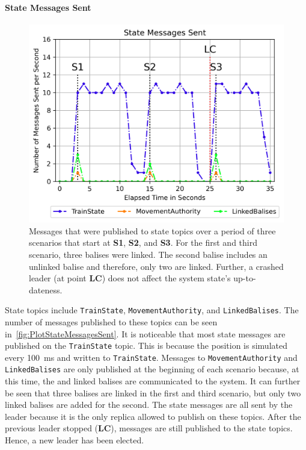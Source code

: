 \paragraph{State Messages Sent}

\begin{figure}[!htb]
	\centering
	\includegraphics[width=0.8\linewidth]{images/plots/StateMessagesSent}
	\caption{Messages that were published to state topics over a period of three scenarios that start at \textbf{S1}, \textbf{S2}, and \textbf{S3}. For the first and third scenario, three balises were linked. The second balise includes an unlinked balise and therefore, only two are linked. Further, a crashed leader (at point \textbf{LC}) does not affect the system state's up-to-dateness.}
	\label{fig:PlotStateMessagesSent}
\end{figure}

State topics include \texttt{TrainState}, \texttt{MovementAuthority}, and \texttt{LinkedBalises}.
The number of messages published to these topics can be seen in~\autoref{fig:PlotStateMessagesSent}.
It is noticeable that most state messages are published on the \texttt{TrainState} topic.
This is because the position is simulated every 100~ms and written to \texttt{TrainState}.
Messages to \texttt{MovementAuthority} and \texttt{LinkedBalises} are only published at the beginning of each scenario because, at this time, the  and linked balises are communicated to the system.
It can further be seen that three balises are linked in the first and third scenario, but only two linked balises are added for the second.
The state messages are all sent by the leader because it is the only replica allowed to publish on these topics.
After the previous leader stopped (\textbf{LC}), messages are still published to the state topics.
Hence, a new leader has been elected.

